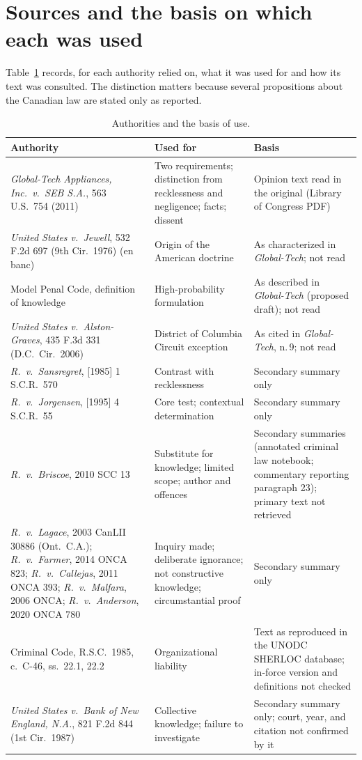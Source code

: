 \documentclass[11pt]{article}
\theoremstyle{plain}
\theoremstyle{definition}
\begin{document}
\appendix
\section{Sources and the basis on which each was used}

Table~\ref{tab:sources} records, for each authority relied on, what it was used for and how its text was consulted. The distinction matters because several propositions about the Canadian law are stated only as reported.

\begin{table}[h]
\centering
\small
\renewcommand{\arraystretch}{1.25}
\begin{tabular}{p{4.3cm}p{4.3cm}p{4.6cm}}
\hline
Authority & Used for & Basis \\
\hline
\emph{Global-Tech Appliances, Inc.\ v.\ SEB S.A.}, 563 U.S.\ 754 (2011) & Two requirements; distinction from recklessness and negligence; facts; dissent & Opinion text read in the original (Library of Congress PDF) \\
\emph{United States v.\ Jewell}, 532 F.2d 697 (9th Cir.\ 1976) (en banc) & Origin of the American doctrine & As characterized in \emph{Global-Tech}; not read \\
Model Penal Code, definition of knowledge & High-probability formulation & As described in \emph{Global-Tech} (proposed draft); not read \\
\emph{United States v.\ Alston-Graves}, 435 F.3d 331 (D.C.\ Cir.\ 2006) & District of Columbia Circuit exception & As cited in \emph{Global-Tech}, n.\,9; not read \\
\emph{R.\ v.\ Sansregret}, [1985] 1 S.C.R.\ 570 & Contrast with recklessness & Secondary summary only \\
\emph{R.\ v.\ Jorgensen}, [1995] 4 S.C.R.\ 55 & Core test; contextual determination & Secondary summary only \\
\emph{R.\ v.\ Briscoe}, 2010 SCC 13 & Substitute for knowledge; limited scope; author and offences & Secondary summaries (annotated criminal law notebook; commentary reporting paragraph 23); primary text not retrieved \\
\emph{R.\ v.\ Lagace}, 2003 CanLII 30886 (Ont.\ C.A.); \emph{R.\ v.\ Farmer}, 2014 ONCA 823; \emph{R.\ v.\ Callejas}, 2011 ONCA 393; \emph{R.\ v.\ Malfara}, 2006 ONCA; \emph{R.\ v.\ Anderson}, 2020 ONCA 780 & Inquiry made; deliberate ignorance; not constructive knowledge; circumstantial proof & Secondary summary only \\
Criminal Code, R.S.C.\ 1985, c.\ C-46, ss.\ 22.1, 22.2 & Organizational liability & Text as reproduced in the UNODC SHERLOC database; in-force version and definitions not checked \\
\emph{United States v.\ Bank of New England, N.A.}, 821 F.2d 844 (1st Cir.\ 1987) & Collective knowledge; failure to investigate & Secondary summary only; court, year, and citation not confirmed by it \\
\hline
\end{tabular}
\caption{Authorities and the basis of use.}
\label{tab:sources}
\end{table}
\end{document}
